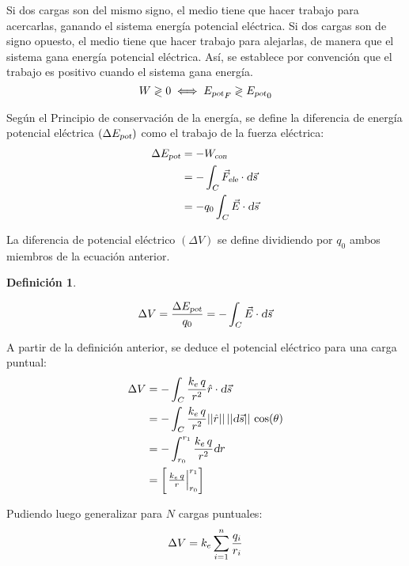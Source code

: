 \documentclass[a5paper,12pt,twoside]{book}
\newtheorem{defn}{{Definición}}[chapter]
\begin{document}
Si dos cargas son del mismo signo, el medio tiene que hacer trabajo para acercarlas, ganando el sistema energía potencial eléctrica. Si dos cargas son de signo opuesto, el medio tiene que hacer trabajo para alejarlas, de manera que el sistema gana energía potencial eléctrica. Así, se establece por convención que el trabajo es positivo cuando el sistema gana energía.
\begin{equation*}
    W \gtrless 0 \iff {{{E}_\textsl{{pot}}}}_F \gtrless {{{E}_\textsl{{pot}}}}_0
\end{equation*}

Según el Principio de conservación de la energía, se define la diferencia de energía potencial eléctrica $(\Delta {{E}_\textsl{{pot}}})$ como el trabajo de la fuerza eléctrica:
\begin{align*}
    \Delta {{E}_\textsl{{pot}}} &= - {{W}_\textsl{{con}}}
    \\
    &= - \int_C {{\Vec{F}}_\textsl{{ele}}} \cdot \textsl{d} \Vec{s}
    \\
    &= - q_0 \int_C \Vec{E} \cdot \textsl{d} \Vec{s}
\end{align*}

La diferencia de potencial eléctrico $(\Delta V)$ se define dividiendo por $q_0$ ambos miembros de la ecuación anterior.

\begin{mdframed}[style=MyFrame1]
    \begin{defn}
        \label{defn:potEle}
    \end{defn}
    \begin{equation*}
        \Delta V = \frac{\Delta {{E}_\textsl{{pot}}}}{q_0} = - \int_C \Vec{E} \cdot \textsl{d} \Vec{s}
    \end{equation*}
\end{mdframed}

A partir de la definición anterior, se deduce el potencial eléctrico para una carga puntual:
\begin{align*}
    \Delta V &= - \int_C \frac{k_e \, q}{r^2} \hat{r} \cdot \textsl{d} \Vec{s}
    \\
    &= - \int_C \frac{k_e \, q}{r^2} {\left|\left| {\hat{r}} \right|\right|} \, {\left|\left| {\textsl{d} \Vec{s}} \right|\right|} \, \cos(\theta)
    \\
    &= - \int_{r_0}^{r_1} \frac{k_e \, q}{r^2} \textsl{d} r
    \\
    &= \begin{bmatrix} \left. \frac{k_e \, q}{r} \right|_{r_0}^{r_1} \end{bmatrix}
\end{align*}

Pudiendo luego generalizar para $N$ cargas puntuales:
\begin{equation}
    \Delta V = k_e \sum_{i=1}^n \frac{q_i}{r_i}
\end{equation}
\end{document}
